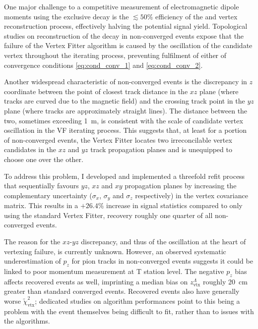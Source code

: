 One major challenge to a competitive measurement of \lz electromagnetic dipole moments using the exclusive \demonstratorfull decay is the $\lesssim 50\%$ efficiency of the \lz and \lbz vertex reconstruction process, effectively halving the potential signal yield.
Topological studies on reconstruction of the \lambdadecay decay in non-converged events expose that the failure of the Vertex Fitter algorithm is caused by the oscillation of the \lz candidate vertex throughout the iterating process, preventing fulfilment of either of convergence conditions \eqref{eq:cond_conv_1} and \eqref{eq:cond_conv_2}.

Another widespread characteristic of non-converged events is the discrepancy in $z$ coordinate between the point of closest track distance in the $xz$ plane (where tracks are curved due to the magnetic field) and the crossing track point in the $yz$ plane (where tracks are approximately straight lines).
The distance between the two, sometimes exceeding \SI{1}{\meter}, is consistent with the scale of candidate vertex oscillation in the VF iterating process.
This suggests that, at least for a portion of non-converged events, the Vertex Fitter locates two irreconcilable vertex candidates in the $xz$ and $yz$ track propagation planes and is unequipped to choose one over the other.

To address this problem, I developed and implemented a threefold refit process that sequentially favours $yz$, $xz$ and $xy$ propagation planes by increasing the complementary uncertainty ($\sigma_x$, $\sigma_y$ and $\sigma_z$ respectively) in the vertex covariance matrix.
This results in a $+26.4\%$ increase in signal statistics compared to only using the standard Vertex Fitter, recovery roughly one quarter of all non-converged \demonstratorshort events.

The reason for the $xz$-$yz$ discrepancy, and thus of the oscillation at the heart of vertexing failure, is currently unknown.
However, an observed systematic underestimation of $p_z$ for pion tracks in non-converged events suggests it could be linked to poor momentum measurement at T station level.
The negative $p_z$ bias affects recovered events as well, imprinting a median bias on $z_\text{vtx}^\Lambda$ roughly \SI{20}{\centi\meter} greater than standard converged events.
Recovered events also have generally worse $\tilde{\chi}^2_\text{vtx}$; dedicated studies on algorithm performances point to this being a problem with the event themselves being difficult to fit, rather than to issues with the algorithms.


